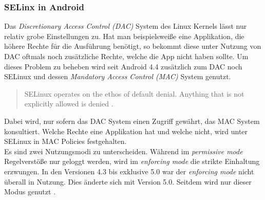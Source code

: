 	\subsubsection{SELinx in Android}
	Das \textit{Discretionary Access Control (DAC)} System des Linux Kernels lässt
	nur relativ grobe Einstellungen zu. Hat man beispielsweiße eine Applikation,
	die höhere Rechte für die Ausführung benötigt, so bekommt diese unter Nutzung
	von DAC oftmals noch zusätzliche Rechte, welche die App nicht haben sollte.	Um
	dieses Problem zu beheben wird seit Android 4.4 zusätzlich zum DAC noch
	SELinux und dessen \textit{Mandatory Access Control (MAC)} System genutzt.
	\begin{quote}
	SELinux operates on the ethos of default denial. Anything that is not
	explicitly allowed is denied \cite{SELinuxAndroid}.
	\end{quote}
	Dabei wird, nur sofern das DAC System einen Zugriff gewährt, das MAC System
	konsultiert. Welche Rechte eine Applikation hat und welche nicht, wird unter
	SELinux in MAC Policies festgehalten.\\
	Es sind zwei Nutzungsmodi zu unterscheiden. Während im \textit{permissive
	mode} Regelverstöße nur geloggt werden, wird im \textit{enforcing mode} die
	strikte Einhaltung erzwungen. In den Versionen 4.3 bis exklusive 5.0 war der
	\textit{enforcing mode} nicht überall in Nutzung. Dies änderte sich mit
	Version 5.0. Seitdem wird nur dieser Modus genutzt \cite{SELinuxAndroid}.	